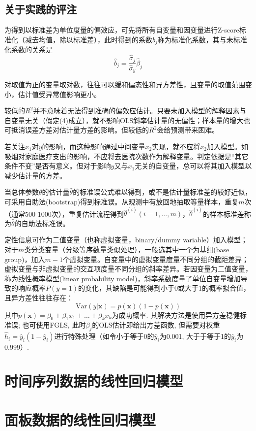 \subsection{关于实践的评注}
\par 为得到以标准差为单位度量的偏效应，可先将所有自变量和因变量进行Z-score标准化（减去均值，除以标准差），此时得到的系数$\hat{b}_j$称为标准化系数，其与未标准化系数的关系是
\begin{equation}
    \hat{b}_j=\frac{\hat{\sigma}_j}{\hat{\sigma}_y}\hat{\beta}_j
\end{equation}

\par 对取值为正的变量取对数，往往可以缓和偏态性和异方差性，且变量的取值范围变小，估计值受异常值影响更小。

\par 较低的$R^2$并不意味着无法得到准确的偏效应估计。只要未加入模型的解释因素与自变量无关（假定(4)成立），就不影响OLS斜率估计量的无偏性；样本量的增大也可抵消误差方差对估计量方差的影响。但较低的$R^2$会给预测带来困难。

\par 若关注$x_1$对$y$的影响，而这种影响通过中间变量$x_2$实现，就不应将$x_2$加入模型。如吸烟对家庭医疗支出的影响，不应将去医院次数作为解释变量。判定依据是“其它条件不变”是否有意义。但对于影响$y$又与$x_1$无关的自变量，总可以将其加入模型以减少估计量的方差。

\par 当总体参数$\theta$的估计量$\hat{\theta}$的标准误公式难以得到，或不是估计量标准差的较好近似，可采用自助法(bootstrap)得到标准误。从观测中有放回地抽取等量样本，重复$m$次（通常500-1000次），重复估计流程得到$\hat{\theta}^{(i)}(i=1,\dots,m)$，$\hat{\theta}^{(i)}$的样本标准差称为$\hat{\theta}$的自助法标准误。

\par 定性信息可作为二值变量（也称虚拟变量，binary/dummy variable）加入模型；对于$m$类分类变量（分级等序数量类似处理），一般选其中一个为基组(base group)，加入$m-1$个虚拟变量。自变量中的虚拟变量度量不同分组的截距差异；虚拟变量与非虚拟变量的交互项度量不同分组的斜率差异。若因变量为二值变量，称为线性概率模型(linear probability model)，斜率系数度量了单位自变量增加导致的响应概率$P(y=1)$的变化，其缺陷是可能得到小于0或大于1的概率拟合值，且异方差性往往存在：
\begin{equation}
    \text{Var}(y\vert \textbf{x})=p(\textbf{x})(1-p(\textbf{x}))
\end{equation}
其中$p(\textbf{x})=\beta_0+\beta_1 x_1+\dots+\beta_kx_k$为成功概率. 其解决方法是使用异方差稳健标准误; 也可使用FGLS, 此时$\beta_j$的OLS估计即给出方差函数, 但需要对权重$\hat{h}_i=\hat{y}_i(1-\hat{y}_i)$进行特殊处理（如令小于等于0的$\hat{y}_i$为0.001, 大于于等于1的$\hat{y}_i$为0.999）. 

\section{时间序列数据的线性回归模型}

\section{面板数据的线性回归模型}